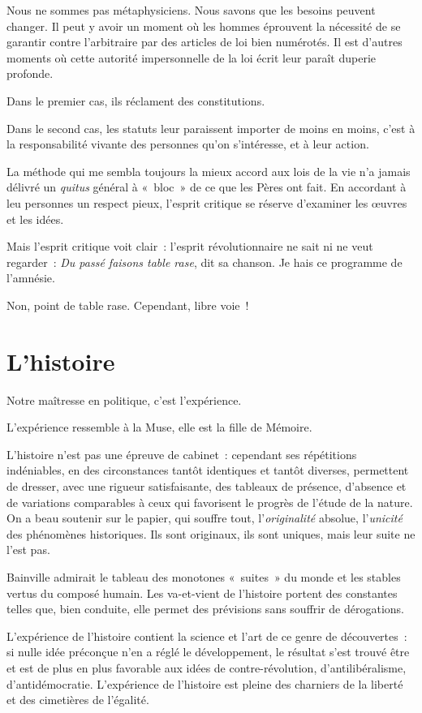 \documentclass[french,twoside]{book} %
\newcommand{\astermono}{\medskip\centerline{\color{rubric}\large\selectfont{\syms ✻}}\medskip\par}%
\begin{document}
\astermono

\noindent Nous ne sommes pas métaphysiciens. Nous savons que les besoins peuvent changer. Il peut y avoir un moment où les hommes éprouvent la nécessité de se garantir contre l’arbitraire par des articles de loi bien numérotés. Il est d’autres moments où cette autorité impersonnelle de la loi écrit leur paraît duperie profonde.\par
Dans le premier cas, ils réclament des constitutions.\par
Dans le second cas, les statuts leur paraissent importer de moins en moins, c’est à la responsabilité vivante des personnes qu’on s’intéresse, et à leur action.\par

\astermono

\noindent La méthode qui me sembla toujours la mieux accord aux lois de la vie n’a jamais délivré un \emph{quitus} général à « bloc » de ce que les Pères ont fait. En accordant à leu personnes un respect pieux, l’esprit critique se réserve d’examiner les œuvres et les idées.\par
Mais l’esprit critique voit clair : l’esprit révolutionnaire ne sait ni ne veut regarder : \emph{Du passé faisons table rase}, dit sa chanson. Je hais ce programme de l’amnésie.\par
Non, point de table rase. Cependant, libre voie !
\section[L’histoire]{L’histoire}
\noindent Notre maîtresse en politique, c’est l’expérience.\par

\astermono

\noindent L’expérience ressemble à la Muse, elle est la fille de Mémoire.\par

\astermono

\noindent L’histoire n’est pas une épreuve de cabinet : cependant ses répétitions indéniables, en des circonstances tantôt identiques et tantôt diverses, permettent de dresser, avec une rigueur satisfaisante, des tableaux de présence, d’absence et de variations comparables à ceux qui favorisent le progrès de l’étude de la nature. On a beau soutenir sur le papier, qui souffre tout, l’\emph{originalité} absolue, l’\emph{unicité} des phénomènes historiques. Ils sont originaux, ils sont uniques, mais leur suite ne l’est pas.\par
Bainville admirait le tableau des monotones « suites » du monde et les stables vertus du composé humain. Les va-et-vient de l’histoire portent des constantes telles que, bien conduite, elle permet des prévisions sans souffrir de dérogations.\par
L’expérience de l’histoire contient la science et l’art de ce genre de découvertes : si nulle idée préconçue n’en a réglé le développement, le résultat s’est trouvé être et est de plus en plus favorable aux idées de contre-révolution, d’antilibéralisme, d’antidémocratie. L’expérience de l’histoire est pleine des charniers de la liberté et des cimetières de l’égalité.\par
\end{document}
